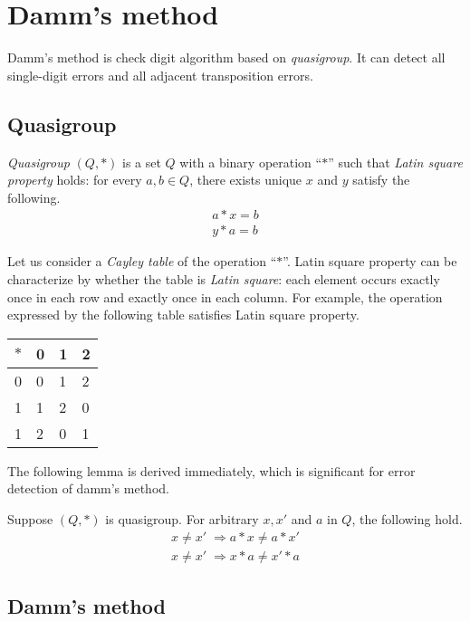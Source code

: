 \chapter{Damm's method}

Damm's method is check digit algorithm based on 
\emph{quasigroup}.
It can detect all single-digit errors and all adjacent transposition errors.

\section{Quasigroup}

\emph{Quasigroup} $(Q,*)$ is a set $Q$ with a binary operation ``$*$''
such that  \emph{ Latin square property} holds:
for every $a,b \in Q$, there exists unique $x$ and $y$ satisfy the following.
\begin{align*}
 a*x = b\\
 y*a = b
\end{align*}

Let us consider a \emph{Cayley table} of the operation ``$*$''.
Latin square property can be characterize by whether 
the table is \emph{Latin square}:
each element occurs exactly once in each row and exactly once in each column.
For example, the operation expressed by the following table
satisfies Latin square property.
\begin{center}
\begin{tabular}{| l || l | l | l |}
\hline
$*$& 0 & 1 & 2\\
\hline\hline
0   & 0 & 1 & 2\\
\hline
1   & 1 & 2 & 0 \\
\hline
1   & 2 & 0 & 1 \\
\hline
\end{tabular}
 \end{center}

The following lemma is derived immediately,
which is significant for error detection  of 
damm's method.
\begin{lemma}
 Suppose $(Q,*)$ is quasigroup.
 For arbitrary $x,x'$ and $a$ in $Q$, the following hold.
\begin{align}
 x \neq x'\; \Rightarrow a*x \neq a*x' \label{eq:lem1}\\
 x \neq x'\; \Rightarrow x*a \neq x'*a \label{eq:lem2}
 \end{align}
\end{lemma}



\section{Damm's method}

